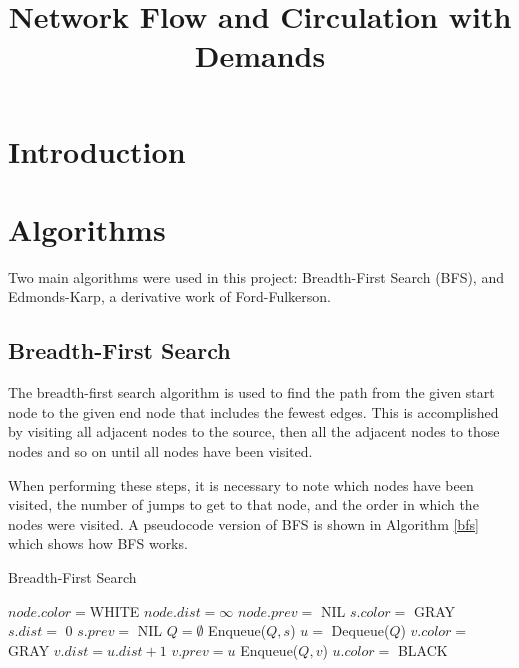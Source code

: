 \documentclass[conference]{IEEEtran}
\begin{document}
\title{Network Flow and Circulation with Demands}


\author{}

\maketitle


\section{Introduction}

\section{Algorithms}\label{algo}
Two main algorithms were used in this project: Breadth-First Search (BFS),
and Edmonds-Karp, a derivative work of Ford-Fulkerson.

\subsection{Breadth-First Search}
The breadth-first search algorithm is used to find the path from the given
start node to the given end node that includes the fewest edges. This is 
accomplished by visiting all adjacent nodes to the source, then all the 
adjacent nodes to those nodes and so on until all nodes have been visited.

When performing these steps, it is necessary to note which nodes have been 
visited, the number of jumps to get to that node, and the order in which 
the nodes were visited. A pseudocode version of BFS is shown in 
Algorithm \ref{bfs} which shows how BFS works. 

\begin{algorithm}
\caption{Breadth-First Search \cite{b1}}\label{bfs}
   \begin{algorithmic}[1]
     \label{bfs_init_loop}
        \State $node.color = $WHITE
        \State $node.dist = \infty$
        \State $node.prev =$ NIL
    \EndFor
    \State $s.color =$ GRAY
    \State $s.dist =$ 0
    \State $s.prev =$ NIL
    \State $Q = \emptyset$
    \State Enqueue($Q, s$)
     \label{bfs_while_loop}
    	\State $u =$ Dequeue($Q$)
    	 \label{bfs_nested_for}
    			\State $v.color =$ GRAY
    			\State $v.dist = u.dist + 1$
    			\State $v.prev = u$
    			\State Enqueue($Q, v$)
    		\EndIf
    	\EndFor
		\State $u.color =$ BLACK
    \EndWhile
    \EndFunction
   \end{algorithmic}
\end{algorithm} 
\end{document}
